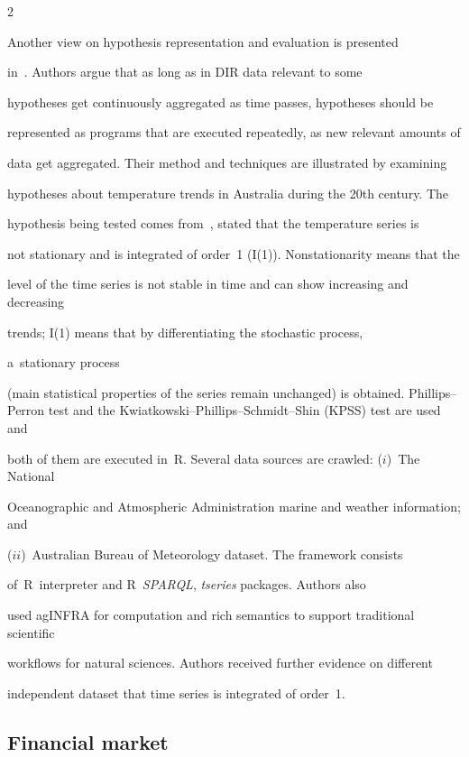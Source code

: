 \begin{multicols}{2}
\noindent


  Another view on hypothesis representation and evaluation is presented


  in~\cite{73-kl}. Authors argue that as long as in DIR data relevant to some


hypotheses get continuously aggregated as time passes, hypotheses should be


represented as programs that are executed repeatedly, as new relevant amounts of


data get aggregated. Their method and techniques are illustrated by examining


hypotheses about temperature trends in Australia during the 20th century. The


hypothesis being tested comes from~\cite{74-kl}, stated that the temperature series is


not stationary and is integrated of order~1 (I(1)). Nonstationarity means that the


level of the time series is not stable in time and can show increasing and decreasing


trends; I(1) means that by differentiating the stochastic process,


a~stationary process


(main statistical properties of the series remain unchanged) is obtained. Phillips--Perron test and the Kwiatkowski--Phillips--Schmidt--Shin (KPSS) test are used and


both of them are executed in~R. Several data sources are crawled: ($i$)~The National


Oceanographic and Atmospheric Administration marine and weather information; and


($ii$)~Australian Bureau of Meteorology dataset. The framework consists


of~R~interpreter and R~\textit{SPARQL}, \textit{tseries} packages. Authors also


used \mbox{agINFRA} for computation and rich semantics to support traditional scientific


workflows for natural sciences. Authors received further evidence on different


independent dataset that time series is integrated of order~1.





\subsection{Financial market}






\end{multicols}
